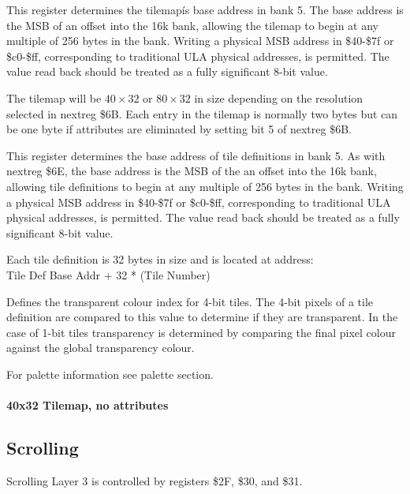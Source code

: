 

This register determines the tilemapís base address in bank 5. The
base address is the MSB of an offset into the 16k bank, allowing the
tilemap to begin at any multiple of 256 bytes in the bank. Writing a
physical MSB address in \$40-\$7f or \$c0-\$ff, corresponding to
traditional ULA physical addresses, is permitted. The value read back
should be treated as a fully significant 8-bit value.

The tilemap will be $40\times32$ or $80\times32$ in size depending on
the resolution selected in nextreg \$6B. Each entry in the tilemap is
normally two bytes but can be one byte if attributes are eliminated by
setting bit 5 of nextreg \$6B.



This register determines the base address of tile definitions in bank
5. As with nextreg \$6E, the base address is the MSB of the an offset
into the 16k bank, allowing tile definitions to begin at any multiple
of 256 bytes in the bank. Writing a physical MSB address in \$40-\$7f
or \$c0-\$ff, corresponding to traditional ULA physical addresses, is
permitted. The value read back should be treated as a fully
significant 8-bit value.

Each tile definition is 32 bytes in size and is located at address:\\
Tile Def Base Addr + 32 * (Tile Number)



Defines the transparent colour index for 4-bit tiles. The 4-bit pixels
of a tile definition are compared to this value to determine if they
are transparent. In the case of 1-bit tiles transparency is determined
by comparing the final pixel colour against the global transparency
colour.

For palette information see palette section.

\paragraph{40x32 Tilemap, no attributes}


\subsection{Scrolling}
Scrolling Layer 3 is controlled by registers \$2F, \$30, and \$31.

